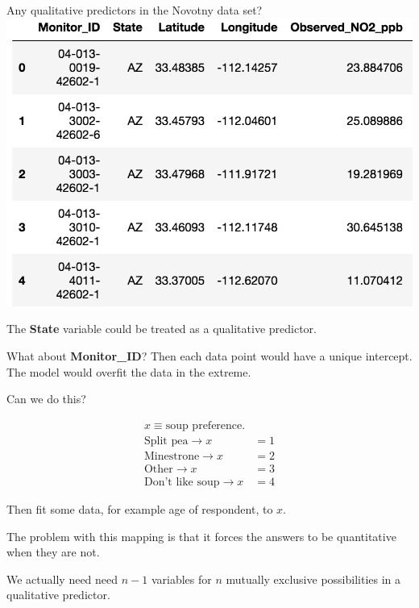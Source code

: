 \documentclass[aspectratio=169]{beamer}
\begin{document}
\begin{frame}{Any qualitative predictors in the Novotny data set?}
\hspace{10mm}
\includegraphics[scale=0.42]{novotny_DF}

\vspace{3mm}
The \textbf{State} variable could be treated as a qualitative predictor.

\vspace{3mm}

What about \textbf{Monitor\_ID}?  \pause Then each data point would have a unique intercept.  The model would overfit the data in the extreme.

\end{frame}

\begin{frame}{Can we do this?}



\vspace{5mm}

\begin{align*}
x \equiv \text{soup preference.}&\\
\text{Split pea} \rightarrow x &= 1\\
\text{Minestrone}  \rightarrow x &= 2\\
\text{Other}  \rightarrow x &= 3\\
\text{Don't like soup}  \rightarrow x &= 4
\end{align*}

\vspace{5mm}

Then fit some data, for example age of respondent, to $x$.
\pause

\vspace{5mm}

The problem with this mapping is that it forces the answers to be quantitative when they are not.

\vspace{3mm}\pause

We actually need need $n-1$ variables for $n$ mutually exclusive possibilities in a qualitative predictor.

\end{frame}
\end{document}
